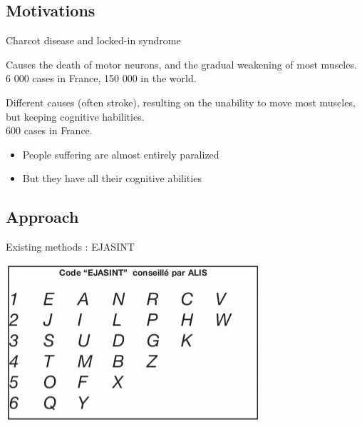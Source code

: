 \documentclass[graphics]{beamer}
\begin{document}
\subsection{Motivations}

\begin{frame}{Charcot disease and locked-in syndrome}
	\begin{tcolorbox}[colback=red!5,colframe=red!40!black,title=Amyotrophic lateral sclerosis]
		Causes the death of motor neurons, and the gradual weakening of most muscles.
		\\
		6 000 cases in France, 150 000 in the world.
	\end{tcolorbox}
	\pause
	\begin{tcolorbox}[colback=red!5,colframe=red!40!black,title=Locked-In Syndrom]
	Different causes (often stroke), resulting on the unability to move most muscles, but keeping cognitive habilities.
	\\
	600 cases in France.
	\end{tcolorbox}
	
	\begin{center}
		\begin{itemize}
			\item People suffering are almost entirely paralized
			\item But they have all their cognitive abilities
		\end{itemize}
	\end{center}
\end{frame}

\subsection{Approach}

\begin{frame}{Existing methods : EJASINT}
	\begin{center}
		\includegraphics[scale=0.7]{ejasint}
	\end{center}
\end{frame}
\end{document}
